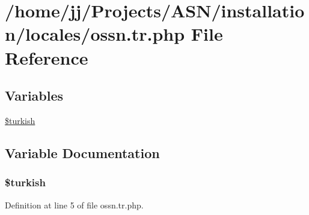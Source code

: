 \hypertarget{installation_2locales_2ossn_8tr_8php}{}\section{/home/jj/\+Projects/\+A\+S\+N/installation/locales/ossn.tr.\+php File Reference}
\label{installation_2locales_2ossn_8tr_8php}
\subsection*{Variables}
\begin{DoxyCompactItemize}
\item 
\hyperlink{installation_2locales_2ossn_8tr_8php_a8a822361a8637a2851b5affd333957a3}{\$turkish}
\end{DoxyCompactItemize}


\subsection{Variable Documentation}
\subsubsection[{\texorpdfstring{\$turkish}{$turkish}}]{\setlength{\rightskip}{0pt plus 5cm}\$turkish}\hypertarget{installation_2locales_2ossn_8tr_8php_a8a822361a8637a2851b5affd333957a3}{}\label{installation_2locales_2ossn_8tr_8php_a8a822361a8637a2851b5affd333957a3}


Definition at line 5 of file ossn.\+tr.\+php.

